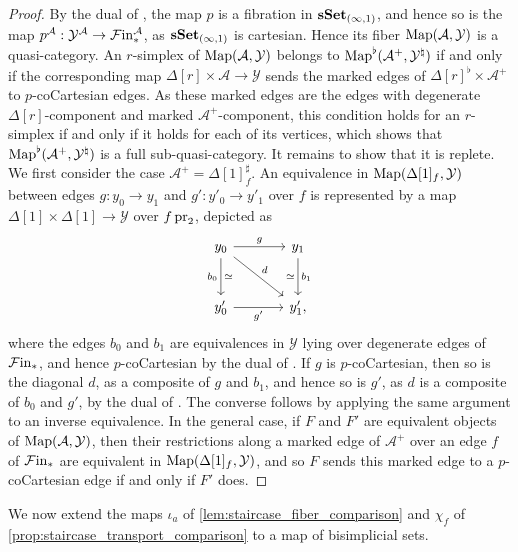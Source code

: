 \documentclass[10pt,reqno]{amsart}
\begin{document}
\begin{proof}
By the dual of \cite[Proposition~3.3.1.7]{lurie2009higher}, the map
$p$ is a fibration in $\mathbf{sSet}_{(\infty,1)}$, and hence so is the map
$p^{\mathcal A}:\mathcal Y^{\mathcal A}\to \mathcal{F}\mathrm{in}_*^{\mathcal A}$, as
$\mathbf{sSet}_{(\infty,1)}$ is cartesian. Hence its fiber
$\operatorname{Map}(\mathcal A,\mathcal Y)$ is a quasi-category. An $r$-simplex
of $\operatorname{Map}(\mathcal A,\mathcal Y)$ belongs to
$\operatorname{Map}^\flat(\mathcal A^+,\mathcal Y^\natural)$ if and only if the
corresponding map $\Delta[r]\times\mathcal A\to\mathcal Y$ sends the
marked edges of $\Delta[r]^\flat\times \mathcal A^+$ to
$p$-coCartesian edges. As these marked edges are the edges with
degenerate $\Delta[r]$-component and marked $\mathcal A^+$-component,
this condition holds for an $r$-simplex if and only if it holds for
each of its vertices, which shows that
$\operatorname{Map}^\flat(\mathcal A^+,\mathcal Y^\natural)$ is a full
sub-quasi-category. It remains to show that it is replete. We first
consider the case $\mathcal A^+=\Delta[1]^\sharp_f$. An equivalence
in $\operatorname{Map}(\Delta[1]_f,\mathcal Y)$ between edges $g:y_0\to y_1$ and
$g':y'_0\to y'_1$ over $f$ is represented by a map
$\Delta[1]\times\Delta[1]\to \mathcal Y$ over $f\operatorname{pr}_2$, depicted as
\[
\begin{tikzcd}[ampersand replacement=\&, sep=large]
y_0\arrow[r,"g"]\arrow[d,"b_0"',"\simeq"]\arrow[rd,"d"]\&
y_1\arrow[d,"b_1","\simeq"']\\
y'_0\arrow[r,"g'"']\&y'_1,
\end{tikzcd}
\]
where the edges $b_0$ and $b_1$ are equivalences in $\mathcal Y$
lying over degenerate edges of $\mathcal{F}\mathrm{in}_*$, and hence
$p$-coCartesian by the dual of
\cite[Proposition~2.4.1.5]{lurie2009higher}. If $g$ is
$p$-coCartesian, then so is the diagonal $d$, as a composite of
$g$ and $b_1$, and hence so is $g'$, as $d$ is a composite of
$b_0$ and $g'$, by the dual of
\cite[Proposition~2.4.1.7]{lurie2009higher}. The converse follows by
applying the same argument to an inverse equivalence. In the general
case, if $F$ and $F'$ are equivalent objects of
$\operatorname{Map}(\mathcal A,\mathcal Y)$, then their restrictions along a marked
edge of $\mathcal A^+$ over an edge $f$ of $\mathcal{F}\mathrm{in}_*$ are
equivalent in $\operatorname{Map}(\Delta[1]_f,\mathcal Y)$, and so $F$ sends this
marked edge to a $p$-coCartesian edge if and only if $F'$ does.
\end{proof}

We now extend the maps $\iota_a$ of
\cref{lem:staircase_fiber_comparison} and $\chi_f$ of
\cref{prop:staircase_transport_comparison} to a map of bisimplicial
sets.
\end{document}
